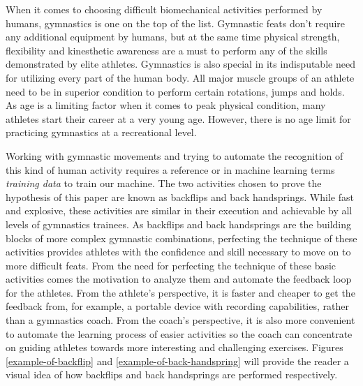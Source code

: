 When it comes to choosing difficult biomechanical activities performed by humans, gymnastics is one on the top of the list. Gymnastic feats don't require any additional equipment by humans, but at the same time physical strength, flexibility and kinesthetic awareness are a must to perform any of the skills demonstrated by elite athletes. Gymnastics is also special in its indisputable need for utilizing every part of the human body. All major muscle groups of an athlete need to be in superior condition to perform certain rotations, jumps and holds. As age is a limiting factor when it comes to peak physical condition, many athletes start their career at a very young age. However, there is no age limit for practicing gymnastics at a recreational level.

Working with gymnastic movements and trying to automate the recognition of this kind of human activity requires a reference or in machine learning terms \textit{training data} to train our machine. The two activities chosen to prove the hypothesis of this paper are known as backflips and back handsprings. While fast and explosive, these activities are similar in their execution and achievable by all levels of gymnastics trainees. As backflips and back handsprings are the building blocks of more complex gymnastic combinations, perfecting the technique of these activities provides athletes with the confidence and skill necessary to move on to more difficult feats. From the need for perfecting the technique of these basic activities comes the motivation to analyze them and automate the feedback loop for the athletes. From the athlete's perspective, it is faster and cheaper to get the feedback from, for example, a portable device with recording capabilities, rather than a gymnastics coach. From the coach's perspective, it is also more convenient to automate the learning process of easier activities so the coach can concentrate on guiding athletes towards more interesting and challenging exercises. Figures \ref{example-of-backflip} and \ref{example-of-back-handspring} will provide the reader a visual idea of how backflips and back handsprings are performed respectively. 

